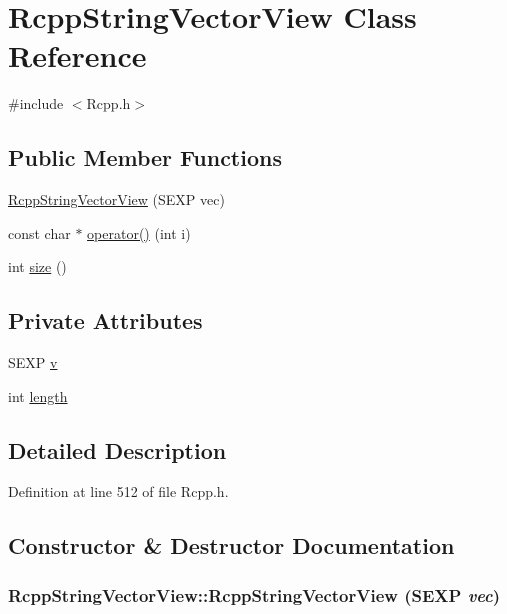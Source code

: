 \hypertarget{classRcppStringVectorView}{
\section{RcppStringVectorView Class Reference}
\label{classRcppStringVectorView}
}


{\ttfamily \#include $<$Rcpp.h$>$}\subsection*{Public Member Functions}
\begin{DoxyCompactItemize}
\item 
\hyperlink{classRcppStringVectorView_ac74085bb16d7a13b58eb59f69268ec85}{RcppStringVectorView} (SEXP vec)
\item 
const char $\ast$ \hyperlink{classRcppStringVectorView_ab81899b7d6c595f84d2fb07809ff002c}{operator()} (int i)
\item 
int \hyperlink{classRcppStringVectorView_adf0f6b6541339ca747c4ed79c445869e}{size} ()
\end{DoxyCompactItemize}
\subsection*{Private Attributes}
\begin{DoxyCompactItemize}
\item 
SEXP \hyperlink{classRcppStringVectorView_a1db3cc1a2dd1809151351c123343c15e}{v}
\item 
int \hyperlink{classRcppStringVectorView_aef6edaa52c234b4bb1fd1fc949fa0f25}{length}
\end{DoxyCompactItemize}


\subsection{Detailed Description}


Definition at line 512 of file Rcpp.h.

\subsection{Constructor \& Destructor Documentation}
\hypertarget{classRcppStringVectorView_ac74085bb16d7a13b58eb59f69268ec85}{
\subsubsection[{RcppStringVectorView}]{\setlength{\rightskip}{0pt plus 5cm}RcppStringVectorView::RcppStringVectorView (SEXP {\em vec})}}
\label{classRcppStringVectorView_ac74085bb16d7a13b58eb59f69268ec85}


